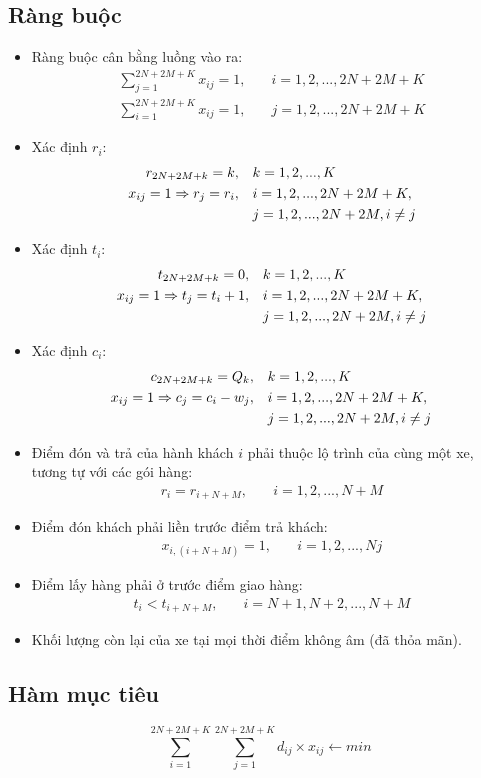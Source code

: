 \documentclass[3p,12pt]{article}
\begin{document}
	\subsection{Ràng buộc}
	\begin{itemize}
		\item Ràng buộc cân bằng luồng vào ra:
		\begin{align}
			\sum_{j=1}^{2N+2M+K} x_{ij} = 1,\quad & i=1,2,...,2N+2M+K \\
			\sum_{i=1}^{2N+2M+K} x_{ij} = 1,\quad & j=1,2,...,2N+2M+K
		\end{align}
		\item Xác định $r_i$:
		\begin{align}
			r_{2N+2M+k} = k,\quad & k=1,2,...,K \\
			x_{ij}=1\Rightarrow r_j=r_i,\quad & i=1,2,...,2N+2M+K, \\
											& j=1,2,...,2N+2M, i\ne j \notag
		\end{align}
		\item Xác định $t_i$:
		\begin{align}
			t_{2N+2M+k} = 0,\quad & k=1,2,...,K \\
			x_{ij}=1\Rightarrow t_j=t_i + 1,\quad & i=1,2,...,2N+2M+K, \\
											& j=1,2,...,2N+2M,i\ne j \notag
		\end{align}
		\item Xác định $c_i$:
		\begin{align}
			c_{2N+2M+k} = Q_k,\quad & k=1,2,...,K \\
			x_{ij}=1\Rightarrow c_j=c_i - w_j,\quad & i=1,2,...,2N+2M+K, \\
											& j=1,2,...,2N+2M,i\ne j \notag
		\end{align}
		\item Điểm đón và trả của hành khách $i$ phải thuộc lộ trình của cùng một xe, tương tự với các gói hàng:
		\begin{align}
			r_i = r_{i+N+M},\quad & i=1,2,...,N+M
		\end{align}
		\item Điểm đón khách phải liền trước điểm trả khách:
		\begin{align}
			x_{i,(i+N+M)} = 1,\quad & i=1,2,...,Nj
		\end{align}
		\item Điểm lấy hàng phải ở trước điểm giao hàng:
		\begin{align}
			t_i < t_{i+N+M},\quad & i=N+1,N+2,...,N+M
		\end{align}
		\item Khối lượng còn lại của xe tại mọi thời điểm không âm (đã thỏa mãn).
	\end{itemize}

	\subsection{Hàm mục tiêu}
	\begin{equation}
		\sum_{i=1}^{2N+2M+K} \sum_{j=1}^{2N+2M+K} d_{ij}\times x_{ij} \leftarrow min
	\end{equation}
\end{document}
